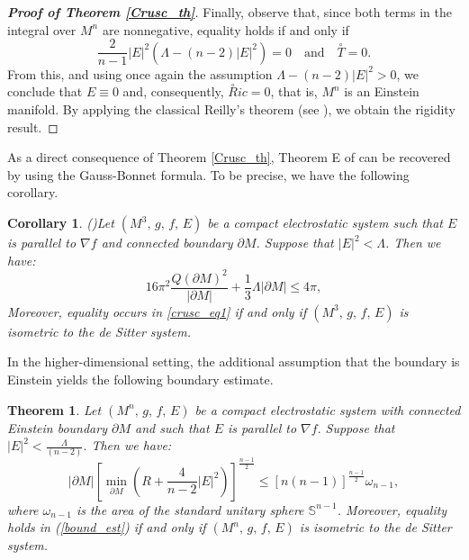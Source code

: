 \documentclass{amsart}
\newtheorem{corollary}{Corollary}
\newtheorem{theorem}{Theorem}
\numberwithin{equation}{section}
\begin{document}
\begin{proof}[{\bf Proof of Theorem \ref{Crusc_th}}]
		
		Finally, observe that, since both terms in the integral over \( M^n \) are nonnegative, equality holds if and only if
		$$\frac{2}{n-1}|E|^{2} \left(\Lambda - (n-2) |E|^{2} \right)=0\quad\mbox{and}\quad\overset{\circ}{T}=0.$$
From this, and using once again the assumption $\Lambda-(n-2)|E|^{2}>0$, we conclude that \( E \equiv 0 \) and, consequently, \( \overset{\circ}Ric = 0 \), that is, $M^n$ is an Einstein manifold. By applying the classical Reilly's theorem (see \cite[Lemma 3]{reilly2}), we obtain the rigidity result.
		
		
	\end{proof}
	
	
	

As a direct consequence of Theorem \ref{Crusc_th}, Theorem E of \cite{tiarlos} can be recovered by using the Gauss-Bonnet formula. To be precise, we have the following corollary. 
	
	
\begin{corollary}(\cite[Theorem E]{tiarlos})\label{cororo}
		Let $(M^3,\, g,\, f,\, E)$ be a compact electrostatic system such that $E$ is parallel to $\nabla f$ and connected boundary $\partial M$. Suppose that $\vert E\vert^{2} < \Lambda$. Then we have:
		\begin{equation}\label{crusc_eq1}
			16\pi^2 \frac{Q(\partial M)^2}{\vert\partial M\vert} +\frac{1}{3}\Lambda|\partial M|\leq 4\pi ,
		\end{equation}
		Moreover, equality occurs in \eqref{crusc_eq1} if and only if $(M^3,\,g,\,f,\,E)$ is isometric to the de Sitter system.  
	\end{corollary}
	
	

	
	
	
In the higher-dimensional setting, the additional assumption that the boundary is Einstein yields the following boundary estimate.


\begin{theorem}\label{alan1}
Let $(M^n,\,g,\,f,\, E)$ be a compact electrostatic system with connected Einstein boundary $\partial M$ and such that $E$ is parallel to $\nabla f.$ Suppose that $\vert E\vert^{2}<\frac{\Lambda}{(n-2)}.$ Then we have: 
\begin{equation}\label{bound_est}
|\partial M| \left[\displaystyle\min_{\partial M}\left(R+\frac{4}{n-2}|E|^{2}\right)\right]^{\frac{n-1}{2}}\leq [n(n-1)]^{\frac{n-1}{2}}\omega_{n-1},
\end{equation}
where $\omega_{n-1}$ is the area of the standard unitary sphere $\mathbb{S}^{n-1}$. Moreover, equality holds in (\ref{bound_est}) if and only if $(M^n,\,g,\,f,\,E)$ is isometric to the de Sitter system.  
\end{theorem}
\end{document}

